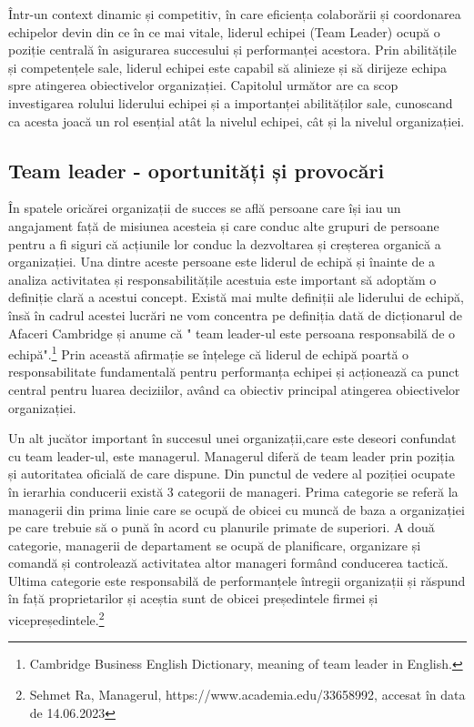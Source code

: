 \documentclass[a4paper, 12pt]{article}
\begin{document}
\quad \quad\space Într-un context dinamic și competitiv, în care eficiența colaborării și coordonarea echipelor devin din ce în ce mai vitale, liderul echipei (Team Leader) ocupă o poziție centrală în asigurarea succesului și performanței acestora. Prin abilitățile și competențele sale, liderul echipei este capabil să alinieze și să dirijeze echipa spre atingerea obiectivelor organizației. Capitolul următor are ca scop investigarea rolului liderului echipei și a importanței abilităților sale, cunoscand ca acesta joacă un rol esențial atât la nivelul echipei, cât și la nivelul organizației.
		\subsection{ Team leader - oportunități și provocări}

\quad\quad\space În spatele oricărei organizații de succes se află persoane care își iau un angajament față de misiunea acesteia și care conduc alte grupuri de persoane pentru a fi siguri că acțiunile lor conduc la dezvoltarea și creșterea organică a organizației. Una dintre aceste persoane este liderul de echipă și înainte de a analiza activitatea și responsabilitățile acestuia este important să adoptăm o definiție clară a acestui concept. Există mai multe definiții ale liderului de echipă, însă în cadrul acestei lucrări ne vom concentra pe definiția dată de dicționarul de Afaceri Cambridge și anume că " team leader-ul  este persoana responsabilă de o echipă".\footnote{Cambridge Business English Dictionary, meaning of team leader in English.} Prin această afirmație se înțelege că liderul de echipă poartă o responsabilitate fundamentală pentru performanța echipei și acționează ca punct central pentru luarea deciziilor, având ca obiectiv principal atingerea obiectivelor organizației.

	\quad\quad Un alt jucător important în succesul unei organizații,care este deseori confundat cu team leader-ul, este managerul. Managerul diferă de team leader prin poziția și autoritatea oficială de care dispune. Din punctul de vedere al poziției ocupate în ierarhia conducerii există 3 categorii de manageri. Prima categorie se referă la managerii din prima linie care se ocupă de obicei cu muncă de baza a organizației pe care trebuie să o pună în acord cu planurile primate de superiori. A două categorie, managerii de departament se ocupă de planificare, organizare și comandă și controlează activitatea altor manageri formând conducerea tactică. Ultima categorie este responsabilă de performanțele întregii organizații și răspund în față proprietarilor și aceștia sunt de obicei președintele firmei și vicepreședintele.\footnote{Sehmet Ra, Managerul, https://www.academia.edu/33658992, accesat în data de 14.06.2023}
\end{document}
